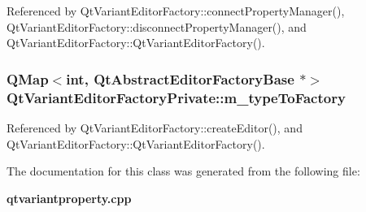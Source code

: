 Referenced by Qt\+Variant\+Editor\+Factory\+::connect\+Property\+Manager(), Qt\+Variant\+Editor\+Factory\+::disconnect\+Property\+Manager(), and Qt\+Variant\+Editor\+Factory\+::\+Qt\+Variant\+Editor\+Factory().

\subsubsection[{m\+\_\+type\+To\+Factory}]{\setlength{\rightskip}{0pt plus 5cm}Q\+Map$<$int, {\bf Qt\+Abstract\+Editor\+Factory\+Base} $\ast$$>$ Qt\+Variant\+Editor\+Factory\+Private\+::m\+\_\+type\+To\+Factory}\label{classQtVariantEditorFactoryPrivate_a215d6c98f159670b116dd45eadfff63e}


Referenced by Qt\+Variant\+Editor\+Factory\+::create\+Editor(), and Qt\+Variant\+Editor\+Factory\+::\+Qt\+Variant\+Editor\+Factory().



The documentation for this class was generated from the following file\+:\begin{DoxyCompactItemize}
\item 
{\bf qtvariantproperty.\+cpp}\end{DoxyCompactItemize}
